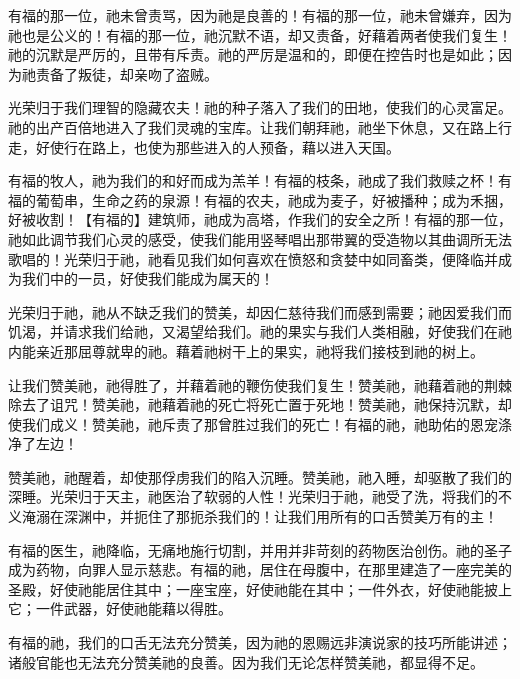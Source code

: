 有福的那一位，祂未曾责骂，因为祂是良善的！有福的那一位，祂未曾嫌弃，因为祂也是公义的！有福的那一位，祂沉默不语，却又责备，好藉着两者使我们复生！祂的沉默是严厉的，且带有斥责。祂的严厉是温和的，即便在控告时也是如此；因为祂责备了叛徒，却亲吻了盗贼。\par

光荣归于我们理智的隐藏农夫！祂的种子落入了我们的田地，使我们的心灵富足。祂的出产百倍地进入了我们灵魂的宝库。让我们朝拜祂，祂坐下休息，又在路上行走，好使行在路上，也使为那些进入的人预备，藉以进入天国。\par

有福的牧人，祂为我们的和好而成为羔羊！有福的枝条，祂成了我们救赎之杯！有福的葡萄串，生命之药的泉源！有福的农夫，祂成为麦子，好被播种；成为禾捆，好被收割！\newline{}【有福的】建筑师，祂成为高塔，作我们的安全之所！有福的那一位，祂如此调节我们心灵的感受，使我们能用竖琴唱出那带翼的受造物以其曲调所无法歌唱的！光荣归于祂，祂看见我们如何喜欢在愤怒和贪婪中如同畜类，便降临并成为我们中的一员，好使我们能成为属天的！\par

光荣归于祂，祂从不缺乏我们的赞美，却因仁慈待我们而感到需要；祂因爱我们而饥渴，并请求我们给祂，又渴望给我们。祂的果实与我们人类相融，好使我们在祂内能亲近那屈尊就卑的祂。藉着祂树干上的果实，祂将我们接枝到祂的树上。\par

让我们赞美祂，祂得胜了，并藉着祂的鞭伤使我们复生！赞美祂，祂藉着祂的荆棘除去了诅咒！赞美祂，祂藉着祂的死亡将死亡置于死地！赞美祂，祂保持沉默，却使我们成义！赞美祂，祂斥责了那曾胜过我们的死亡！有福的祂，祂助佑的恩宠涤净了左边！\par

赞美祂，祂醒着，却使那俘虏我们的陷入沉睡。赞美祂，祂入睡，却驱散了我们的深睡。光荣归于天主，祂医治了软弱的人性！光荣归于祂，祂受了洗，将我们的不义淹溺在深渊中，并扼住了那扼杀我们的！让我们用所有的口舌赞美万有的主！\par

有福的医生，祂降临，无痛地施行切割，并用并非苛刻的药物医治创伤。祂的圣子成为药物，向罪人显示慈悲。有福的祂，居住在母腹中，在那里建造了一座完美的圣殿，好使祂能居住其中；一座宝座，好使祂能在其中；一件外衣，好使祂能披上它；一件武器，好使祂能藉以得胜。\par

有福的祂，我们的口舌无法充分赞美，因为祂的恩赐远非演说家的技巧所能讲述；诸般官能也无法充分赞美祂的良善。因为我们无论怎样赞美祂，都显得不足。\par


